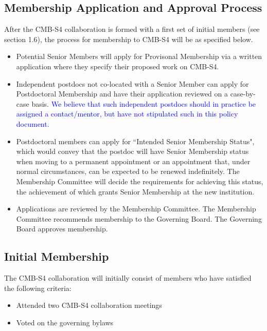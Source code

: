 \subsection{Membership Application and Approval Process}
After the CMB-S4 collaboration is formed with a first set of initial members (see section 1.6), the process for membership to CMB-S4 will be as specified below.

\begin{itemize}

\item Potential Senior Members will apply for Provisonal Membership via a written application where they specify their proposed work on CMB-S4. 

\item Independent postdocs not co-located with a Senior Member can apply for Postdoctoral Membership and have their application reviewed on a case-by-case basis. \textcolor{blue}{We believe that such independent postdocs should in practice be assigned a contact/mentor, but have not stipulated such in this policy document.}  

\item Postdoctoral members can apply for ``Intended Senior Membership Status", which would convey that the postdoc will have Senior Membership status when moving to a permanent appointment or an appointment that, under normal circumstances, can be expected to be renewed indefinitely.  The Membership Committee will decide the requirements for achieving this status, the achievement of which grants Senior Membership at the new institution.

\item Applications are reviewed by the Membership Committee. The Membership Committee recommends membership to the Governing Board.  The Governing Board approves membership.

\end{itemize}

\subsection{Initial Membership}
The CMB-S4 collaboration will initially consist of members who have satisfied the following criteria:

\begin{itemize}
\item Attended two CMB-S4 collaboration meetings 

\item Voted on the governing bylaws
\end{itemize}

